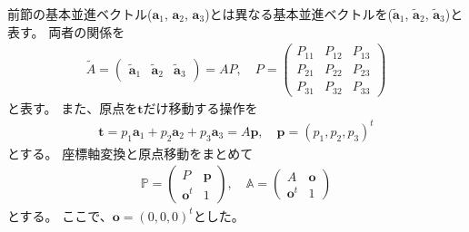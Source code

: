\documentclass[11pt]{easymemo}
\begin{document}
前節の基本並進ベクトル($\bm{a}_{1}$, $\bm{a}_{2}$, $\bm{a}_{3}$)とは異なる基本並進ベクトルを($\widetilde{\bm{a}}_{1}$, $\widetilde{\bm{a}}_{2}$, $\widetilde{\bm{a}}_{3}$)と表す。
両者の関係を
\begin{align}
  \widetilde{A}=
  \begin{pmatrix} \widetilde{\bm{a}}_{1} & \widetilde{\bm{a}}_{2} & \widetilde{\bm{a}}_{3} \end{pmatrix}
  =
  AP,
  \quad
  P=\begin{pmatrix}
    P_{11} & P_{12} & P_{13} \\
    P_{21} & P_{22} & P_{23} \\
    P_{31} & P_{32} & P_{33}
  \end{pmatrix}
\end{align}
と表す。
また、原点を$\bm{t}$だけ移動する操作を
\begin{align}
  \bm{t}=p_{1}\bm{a}_{1}+p_{2}\bm{a}_{2}+p_{3}\bm{a}_{3}=A\bm{p},
  \quad
  \bm{p}=(p_{1},p_{2},p_{3})^{t}
\end{align}
とする。
座標軸変換と原点移動をまとめて
\begin{align}
  \mathbb{P}=\begin{pmatrix}
    P          & \bm{p} \\
    \bm{o}^{t} & 1
  \end{pmatrix},
  \quad
  \mathbb{A}=\begin{pmatrix}
    A          & \bm{o} \\
    \bm{o}^{t} & 1
  \end{pmatrix}
\end{align}
とする。
ここで、$\bm{o}=(0,0,0)^{t}$とした。
\end{document}
